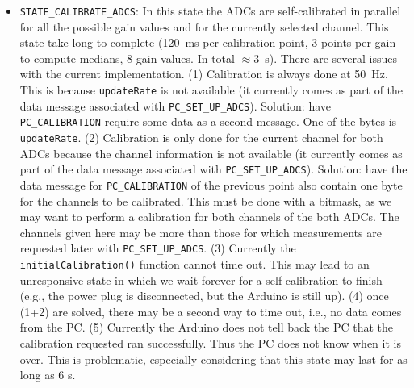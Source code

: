 \documentclass[11pt,a4paper,english]{article}
\begin{document}
\begin{itemize}
\item \texttt{STATE\_CALIBRATE\_ADCS}: In this state the ADCs are self-calibrated in parallel for all the possible gain values and for the currently selected channel. This state take long to complete (120~ms per calibration point, 3 points per gain to compute medians, 8 gain values. In total $\approx3$~s). There are several issues with the current implementation. (1) Calibration is always done at 50~Hz. This is because \texttt{updateRate} is not available (it currently comes as part of the data message associated with \texttt{PC\_SET\_UP\_ADCS}). Solution: have \texttt{PC\_CALIBRATION} require some data as a second message. One of the bytes is \texttt{updateRate}. (2) Calibration is only done for the current channel for both ADCs because the channel information is not available (it currently comes as part of the data message associated with \texttt{PC\_SET\_UP\_ADCS}). Solution: have the data message for \texttt{PC\_CALIBRATION} of the previous point also contain one byte for the channels to be calibrated. This must be done with a bitmask, as we may want to perform a calibration for both channels of the both ADCs. The channels given here may be more than those for which measurements are requested later with \texttt{PC\_SET\_UP\_ADCS}. (3) Currently the \texttt{initialCalibration()} function cannot time out. This may lead to an unresponsive state in which we wait forever for a self-calibration to finish (e.g., the power plug is disconnected, but the Arduino is still up). (4) once (1+2) are solved, there may be a second way to time out, i.e., no data comes from the PC. (5) Currently the Arduino does not tell back the PC that the calibration requested ran successfully. Thus the PC does not know when it is over. This is problematic, especially considering that this state may last for as long as 6 s.

\end{itemize}
\end{document}
